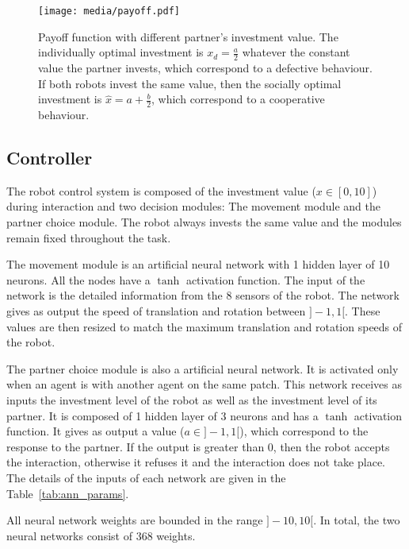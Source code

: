 \documentclass[letterpaper]{article}
\begin{document}
\begin{figure}[htpb]
    \centering
    \texttt{[image: media/payoff.pdf]}
    \caption{Payoff function with different partner's investment value. The individually optimal investment is $x_d = \frac{a}{2}$ whatever the constant value the partner invests, which correspond to a defective behaviour. If both robots invest the same value, then the socially optimal investment is $\hat{x} = a + \frac{b}{2}$, which correspond to a cooperative behaviour.}
    \label{fig:payoff}
\end{figure}

\subsection{Controller}

The robot control system is composed of the investment value ($x \in [0, 10]$) during interaction and two decision modules: The movement module and the partner choice module. The robot always invests the same value and the modules remain fixed throughout the task. 

The movement module is an artificial neural network with 1 hidden layer of 10 neurons. All the nodes have a $\tanh$ activation function. The input of the network is the detailed information from the 8 sensors of the robot. The network gives as output the speed of translation and rotation between $]-1, 1[$. These values are then resized to match the maximum translation and rotation speeds of the robot.

The partner choice module is also a artificial neural network. It is activated only when an agent is with another agent on the same patch. This network receives as inputs the investment level of the robot as well as the investment level of its partner. It is composed of 1 hidden layer of 3 neurons and has a $\tanh$ activation function. It gives as output a value ($a \in ]-1, 1[$), which correspond to the response to the partner. If the output is greater than 0, then the robot accepts the interaction, otherwise it refuses it and the interaction does not take place.  The details of the inputs of each network are given in the Table~\ref{tab:ann_params}.

All neural network weights are bounded in the range $]-10, 10[$. In total, the two neural networks consist of 368 weights.
\end{document}

